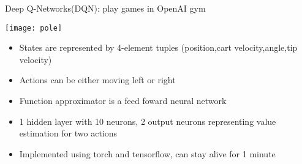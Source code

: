 \begin{frame}{Deep Q-Networks(DQN): play games in OpenAI gym}
    \begin{center}\texttt{[image: pole]}\end{center}
    \begin{itemize}
        \item States are represented by 4-element tuples (position,cart velocity,angle,tip velocity)
        \item Actions can be either moving left or right
        \item Function approximator is a feed foward neural network 
        \item 1 hidden layer with 10 neurons, 2 output neurons representing value estimation for two actions
        \item Implemented using torch and tensorflow, can stay alive for 1 minute
    \end{itemize}

\end{frame}

